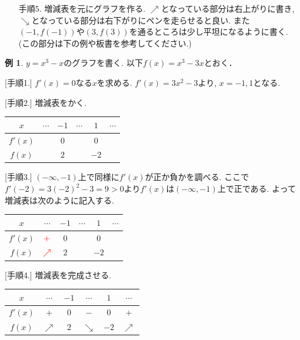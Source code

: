 \documentclass[dvipdfmx,a4paper,11pt]{article}
\theoremstyle{definition}
\newtheorem{exa}[thm]{例}
\newcommand{\xr}[1]{\textcolor{red}{#1}}
\begin{document}
\begin{tcolorbox}[
    colback = white,
    colframe = green!35!black,
    fonttitle = \bfseries,
    breakable = true]
\begin{itemize}
\item[手順5.] 増減表を元にグラフを作る. $\nearrow$となっている部分は右上がりに書き, $\searrow$となっている部分は右下がりにペンを走らせると良い. また$(-1, f(-1))$や$(3, f(3))$を通るところは少し平坦になるように書く. (この部分は下の例や板書を参考してください.)

\end{itemize}
\end{tcolorbox}

\begin{exa}
$y=x^3 - x$のグラフを書く. 以下$f(x) = x^3 - 3x$とおく．

[手順1.] $f'(x)=0$なる$x$を求める.
 $f'(x)=3x^2-3$より, $x =-1,1$となる. 
 
 [手順2.] 増減表をかく.
\begin{tabular}{|c||ccccc|}
\hline
$x$ & $\cdots$ & $-1$ & $\cdots$ & $1$ & $\cdots$ \\
\hline
$f'(x)$ &  & $0$ &  & $0$ &  \\
\hline
$f(x)$  &  & $2$ &  & $-2$&  \\
\hline
\end{tabular}

[手順3.] $(-\infty, -1)$上で同様に$f'(x)$が正か負かを調べる.
ここで$f'(-2)=3(-2)^2 - 3 = 9>0$より$f'(x)$は$(-\infty, -1)$上で正である. よって増減表は次のように記入する. 

\begin{center}
\begin{tabular}{|c||ccccc|}
\hline
$x$ & $\cdots$ & $-1$ & $\cdots$ & $1$ & $\cdots$ \\
\hline
$f'(x)$ & $\xr{+}$   & $0$ &  & $0$ &  \\
\hline
$f(x)$  &  $\xr{\nearrow}$  & $2$ &  & $-2$&  \\
\hline
\end{tabular}
\end{center}

[手順4.] 増減表を完成させる.

\begin{center}
\begin{tabular}{|c||ccccc|}
\hline
$x$ & $\cdots$ & $-1$ & $\cdots$ & $1$ & $\cdots$ \\
\hline
$f'(x)$ & $+$ & $0$ & $-$ & $0$ & $+$ \\
\hline
$f(x)$ & $\nearrow$ &$2$ & $\searrow$ & $-2$& $\nearrow$ \\
\hline
\end{tabular}
\end{center}



\end{exa}
\end{document}
